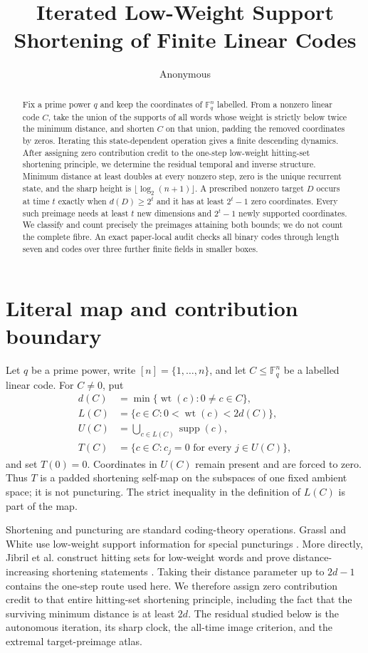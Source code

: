 \documentclass[a4paper,10pt]{amsart}
\title[Low-weight support shortening]{Iterated Low-Weight Support Shortening of Finite Linear Codes}
\author{Anonymous}
\date{}
\theoremstyle{remark}
\newcommand{\F}{\mathbb F}
\newcommand{\supp}{\operatorname{supp}}
\newcommand{\wt}{\operatorname{wt}}
\begin{document}
\begin{abstract}
Fix a prime power $q$ and keep the coordinates of $\F_q^n$ labelled.  From
a nonzero linear code $C$, take the union of the supports of all words whose
weight is strictly below twice the minimum distance, and shorten $C$ on
that union, padding the removed coordinates by zeros.  Iterating this
state-dependent operation gives a finite descending dynamics.  After
assigning zero contribution credit to the one-step low-weight hitting-set
shortening principle, we determine the residual temporal and inverse
structure.  Minimum distance at least doubles at every nonzero step, zero
is the unique recurrent state, and the sharp height is
$\lfloor\log_2(n+1)\rfloor$.  A prescribed nonzero target $D$ occurs at
time $t$ exactly when $d(D)\geq2^t$ and it has at least $2^t-1$ zero
coordinates.  Every such preimage needs at least $t$ new dimensions and
$2^t-1$ newly supported coordinates.  We classify and count precisely the
preimages attaining both bounds; we do not count the complete fibre.  An
exact paper-local audit checks all binary codes through length seven and
codes over three further finite fields in smaller boxes.
\end{abstract}

\maketitle

\section{Literal map and contribution boundary}

Let $q$ be a prime power, write $[n]=\{1,\ldots,n\}$, and let
$C\leq\F_q^n$ be a labelled linear code.
For $C\ne0$, put
\begin{align*}
 d(C)&=\min\{\wt(c):0\ne c\in C\},\\
 L(C)&=\{c\in C:0<\wt(c)<2d(C)\},\\
 U(C)&=\bigcup_{c\in L(C)}\supp(c),\\
 T(C)&=\{c\in C:c_j=0\text{ for every }j\in U(C)\},
\end{align*}
and set $T(0)=0$.  Coordinates in $U(C)$ remain present and are forced to
zero.  Thus $T$ is a padded shortening self-map on the subspaces of one
fixed ambient space; it is not puncturing.  The strict inequality in the
definition of $L(C)$ is part of the map.

Shortening and puncturing are standard coding-theory operations.  Grassl
and White use low-weight support information for special puncturings
\cite{GrasslWhite2004}.  More directly, Jibril et al. construct hitting sets
for low-weight words and prove distance-increasing shortening statements
\cite{JibrilEtAl2013}.  Taking their distance parameter up to $2d-1$
contains the one-step route used here.  We therefore assign zero
contribution credit to that entire hitting-set shortening principle,
including the fact that the surviving minimum distance is at least $2d$.
The residual studied below is the autonomous iteration, its sharp clock,
the all-time image criterion, and the extremal target-preimage atlas.
\end{document}

